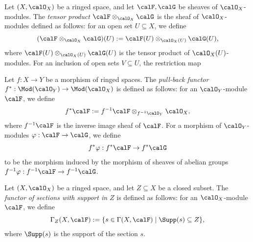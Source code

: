     \begin{definition}\label{def:tensor_product_of_sheaves}
        Let \((X,\calO_X)\) be a ringed space, and let \(\calF,\calG\) be sheaves of \(\calO_X\)-modules.
        The \emph{tensor product} \(\calF \otimes_{\calO_X} \calG\) is the sheaf of \(\calO_X\)-modules defined as follows:
        for an open set \(U\subseteq X\), we define
        \[
            (\calF \otimes_{\calO_X} \calG)(U) := \calF(U) \otimes_{\calO_X(U)} \calG(U),
        \]
        where \(\calF(U) \otimes_{\calO_X(U)} \calG(U)\) is the tensor product of \(\calO_X(U)\)-modules.
        For an inclusion of open sets \(V\subseteq U\), the restriction map

    \end{definition}

    \begin{definition}\label{def:pull_back_of_sheaves}
        Let \(f:X\to Y\) be a morphism of ringed spaces.
        The \emph{pull-back functor} \(f^*:\Mod(\calO_Y)\to \Mod(\calO_X)\) is defined as follows:
        for an \(\calO_Y\)-module \(\calF\), we define
        \[
            f^*\calF := f^{-1}\calF \otimes_{f^{-1}\calO_Y} \calO_X,
        \]
        where \(f^{-1}\calF\) is the inverse image sheaf of \(\calF\).
        For a morphism of \(\calO_Y\)-modules \(\varphi:\calF\to \calG\), we define
        \[
            f^*\varphi: f^*\calF \to f^*\calG
        \]
        to be the morphism induced by the morphism of sheaves of abelian groups \(f^{-1}\varphi:f^{-1}\calF \to f^{-1}\calG\).
    \end{definition}

    \begin{definition}\label{def:functor_of_sections_with_support}
        Let \((X,\calO_X)\) be a ringed space, and let \(Z\subseteq X\) be a closed subset.
        The \emph{functor of sections with support in \(Z\)} is defined as follows:
        for an \(\calO_X\)-module \(\calF\), we define
        \[
            \Gamma_Z(X,\calF) := \{ s \in \Gamma(X,\calF) \mid \Supp(s) \subseteq Z \},
        \]
        where \(\Supp(s)\) is the support of the section \(s\).
    \end{definition}


